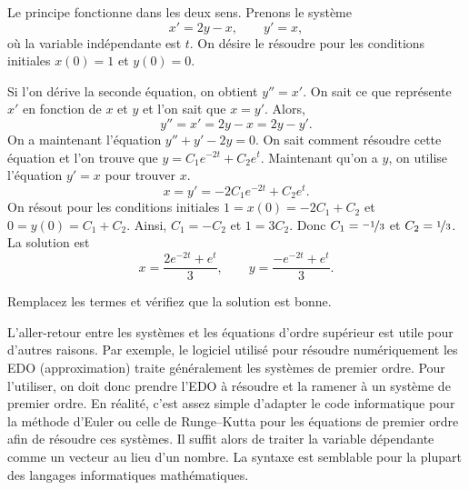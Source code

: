 \begin{example}
Le principe fonctionne dans les deux sens. Prenons le système
\begin{equation*}
x' = 2y-x , \qquad
y' = x, 
\end{equation*}
où la variable indépendante est $t$.  On désire le résoudre pour les conditions initiales $x(0) = 1$ et $y(0) =0$.

Si l'on dérive la seconde équation, on obtient
$y''=x'$.  On sait ce que représente $x'$ en fonction de $x$ et $y$ et l'on sait que $x=y'$.  Alors,
\begin{equation*}
y'' = x' = 2y-x = 2y-y' .
\end{equation*}
On a maintenant l'équation $y''+y'-2y = 0$.  On sait comment résoudre cette équation et l'on trouve que $y = C_1 e^{-2t} + C_2 e^t$.  Maintenant qu'on a $y$,
on utilise l'équation $y' = x$ pour trouver $x$.
\begin{equation*}
x = y' = -2 C_1 e^{-2t} + C_2 e^t .
\end{equation*}
On résout pour les conditions initiales $1 = x(0) = -2 C_1 + C_2$
et $0 = y(0) = C_1 + C_2$.  Ainsi, $C_1 = -C_2$ et $1 = 3C_2$.
Donc $C_1 = \nicefrac{-1}{3}$ et $C_2 = \nicefrac{1}{3}$.  La solution est
\begin{equation*}
x = \frac{2e^{-2t} + e^t}{3} ,\qquad
y = \frac{-e^{-2t} + e^t}{3} .
\end{equation*}
\end{example}

\begin{exercise}
Remplacez les termes et vérifiez que la solution est bonne.
\end{exercise}

L’aller-retour entre les systèmes et les équations d'ordre supérieur est utile pour d’autres raisons. Par exemple, le logiciel utilisé pour résoudre numériquement les EDO (approximation) traite généralement les systèmes de premier ordre. Pour l’utiliser, on doit donc prendre l’EDO à résoudre et la ramener à un système de premier ordre. En réalité, c’est assez simple d’adapter le code informatique pour la méthode d’Euler ou celle de Runge–Kutta pour les équations de premier ordre afin de résoudre ces systèmes. Il suffit alors de traiter la variable dépendante comme un vecteur au lieu d’un nombre. La syntaxe est semblable pour la plupart des langages informatiques mathématiques.


